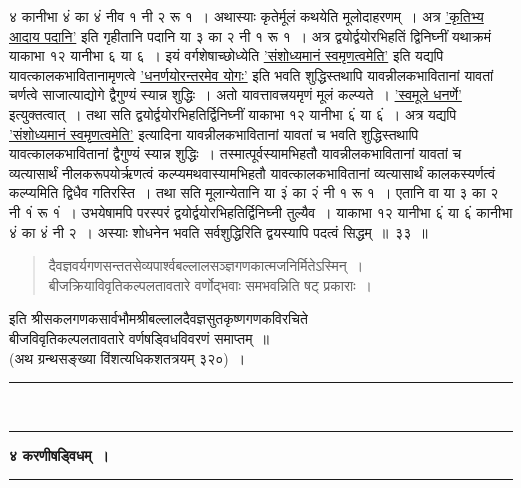 \documentclass[11pt, openany]{book}
\begin{document}
\begin{sloppypar}
\noindent ४ कानीभा ४ं का ४ं नीव १ नी २ रू १~। अथास्याः कृतेर्मूलं कथयेति मूलोदाहरणम्~। अत्र \hyperref[3.31]{'कृतिभ्य आदाय पदानि'} इति गृहीतानि पदानि या ३ का २ नी १ रू १~। अत्र द्वयोर्द्वयोरभिहतिं द्विनिघ्नीं यथाक्रमं याकाभा १२ यानीभा ६ या ६~। इयं वर्गशेषाच्छोध्येति \hyperref[1.7]{'संशोध्यमानं स्वमृणत्वमेति'} इति यद्यपि यावत्कालकभावितानामृणत्वे \hyperref[1.3]{'धनर्णयोरन्तरमेव योगः'} इति भवति शुद्धिस्तथापि यावन्नीलकभावितानां यावतां चर्णत्वे साजात्याद्योगे द्वैगुण्यं स्यान्न शुद्धिः~। अतो यावत्तावत्त्रयमृणं मूलं कल्प्यते~। \hyperref[1.13]{'स्वमूले धनर्णे'} इत्युक्तत्वात्~। तथा सति द्वयोर्द्वयोरभिहतिर्द्विनिघ्नीं याकाभा १२ यानीभा ६ं या ६ं~। अत्र यद्यपि \hyperref[1.7]{'संशोध्यमानं स्वमृणत्वमेति'} इत्यादिना यावन्नीलकभावितानां यावतां च भवति शुद्धिस्तथापि यावत्कालकभावितानां द्वैगुण्यं स्यान्न शुद्धिः~। तस्मात्पूर्वस्यामभिहतौ यावन्नीलकभावितानां यावतां च व्यत्यासार्थं नीलकरूपयोर्ऋणत्वं कल्प्यमथवास्यामभिहतौ यावत्कालकभावितानां व्यत्यासार्थं कालकस्यर्णत्वं कल्प्यमिति द्विधैव गतिरस्ति~। तथा सति मूलान्येतानि या ३ं का २ं नी १ रू १~। एतानि वा या ३ का २ नी १ं रू १ं~। उभयेषामपि परस्परं द्वयोर्द्वयोरभिहतिर्द्विनिघ्नी तुल्यैव~। याकाभा १२ यानीभा ६ं या ६ं कानीभा ४ं का ४ं नी २~। अस्याः शोधनेन भवति सर्वशुद्धिरिति द्वयस्यापि पदत्वं सिद्धम्~॥~३३~॥ 

\begin{quote}
{\color{violet}दैवज्ञवर्यगणसन्ततसेव्यपार्श्वबल्लालसञ्ज्ञगणकात्मजनिर्मितेऽस्मिन्~। \\
बीजक्रियाविवृतिकल्पलतावतारे वर्णोद्भवाः समभवन्निति षट् प्रकाराः~।}
\end{quote}
\vspace{-1mm}

\begin{center}
इति श्रीसकलगणकसार्वभौमश्रीबल्लालदैवज्ञसुतकृष्णगणकविरचिते\\
बीजविवृतिकल्पलतावतारे वर्णषड्विधविवरणं समाप्तम्~॥\\
(अथ ग्रन्थसङ्ख्या विंशत्यधिकशतत्रयम् ३२०)~।
\vspace{6mm}

\rule{0.2\linewidth}{0.8pt}\\
\vspace{-4mm}

\rule{0.2\linewidth}{0.8pt}
\end{center}
\end{sloppypar}

\newpage
\thispagestyle{empty}

\begin{center}
\textbf{\large ४\; करणीषड्विधम्~।}\\
\rule{0.2\linewidth}{0.8pt}
\end{center}
\end{document}
